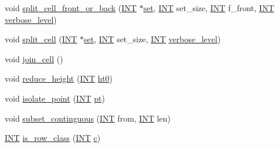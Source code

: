 \begin{DoxyCompactItemize}
\item 
void \mbox{\hyperlink{classpartitionstack_a7f8fd8ee23538d664e0ce22b10b41d33}{split\+\_\+cell\+\_\+front\+\_\+or\+\_\+back}} (\mbox{\hyperlink{galois_8h_a09fddde158a3a20bd2dcadb609de11dc}{I\+NT}} $\ast$\mbox{\hyperlink{nauty_8h_a9690bea211101f22a5e154087590c3da}{set}}, \mbox{\hyperlink{galois_8h_a09fddde158a3a20bd2dcadb609de11dc}{I\+NT}} set\+\_\+size, \mbox{\hyperlink{galois_8h_a09fddde158a3a20bd2dcadb609de11dc}{I\+NT}} f\+\_\+front, \mbox{\hyperlink{galois_8h_a09fddde158a3a20bd2dcadb609de11dc}{I\+NT}} \mbox{\hyperlink{simeon_8_c_a818073fbcc2f439e7c56952f67386122}{verbose\+\_\+level}})
\item 
void \mbox{\hyperlink{classpartitionstack_a1b761500b635cd05ca1c02666e288315}{split\+\_\+cell}} (\mbox{\hyperlink{galois_8h_a09fddde158a3a20bd2dcadb609de11dc}{I\+NT}} $\ast$\mbox{\hyperlink{nauty_8h_a9690bea211101f22a5e154087590c3da}{set}}, \mbox{\hyperlink{galois_8h_a09fddde158a3a20bd2dcadb609de11dc}{I\+NT}} set\+\_\+size, \mbox{\hyperlink{galois_8h_a09fddde158a3a20bd2dcadb609de11dc}{I\+NT}} \mbox{\hyperlink{simeon_8_c_a818073fbcc2f439e7c56952f67386122}{verbose\+\_\+level}})
\item 
void \mbox{\hyperlink{classpartitionstack_af410b96e954d08233aec13e7d75dcba4}{join\+\_\+cell}} ()
\item 
void \mbox{\hyperlink{classpartitionstack_a80fea7b8bae0f030cc5fc736f19a2721}{reduce\+\_\+height}} (\mbox{\hyperlink{galois_8h_a09fddde158a3a20bd2dcadb609de11dc}{I\+NT}} \mbox{\hyperlink{classpartitionstack_a148b5b247cc3b8653d850f6b9b0fc883}{ht0}})
\item 
void \mbox{\hyperlink{classpartitionstack_a4ac45f126b236c5f9d3ac89126f0897a}{isolate\+\_\+point}} (\mbox{\hyperlink{galois_8h_a09fddde158a3a20bd2dcadb609de11dc}{I\+NT}} \mbox{\hyperlink{clique__finder_8_c_aec1f1a2b30fdca8844c2932384483145}{pt}})
\item 
void \mbox{\hyperlink{classpartitionstack_a9a58475ddfa123b384ff187b290fa37c}{subset\+\_\+continguous}} (\mbox{\hyperlink{galois_8h_a09fddde158a3a20bd2dcadb609de11dc}{I\+NT}} from, \mbox{\hyperlink{galois_8h_a09fddde158a3a20bd2dcadb609de11dc}{I\+NT}} len)
\item 
\mbox{\hyperlink{galois_8h_a09fddde158a3a20bd2dcadb609de11dc}{I\+NT}} \mbox{\hyperlink{classpartitionstack_ad8497b40f1c327d3eb2fb2b993d88bb7}{is\+\_\+row\+\_\+class}} (\mbox{\hyperlink{galois_8h_a09fddde158a3a20bd2dcadb609de11dc}{I\+NT}} \mbox{\hyperlink{alphabet2_8_c_a4e1e0e72dd773439e333c84dd762a9c3}{c}})
\item 

\end{DoxyCompactItemize}
